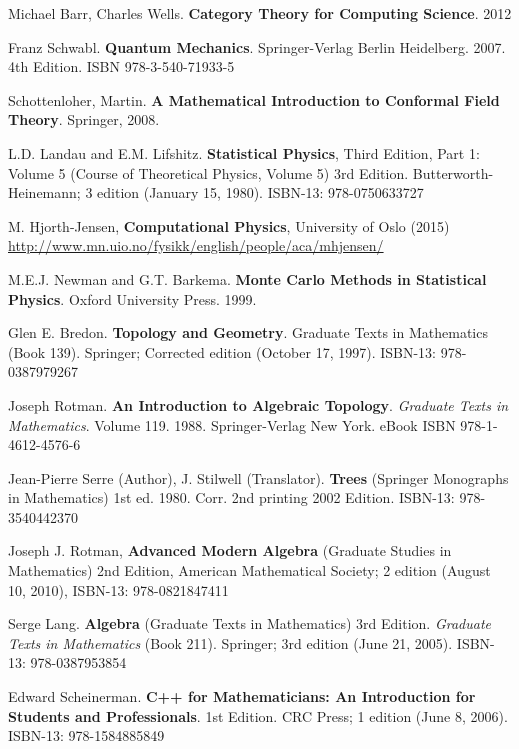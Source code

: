 \documentclass[10pt]{amsart}
\begin{document}
\begin{thebibliography}{9}
Michael Barr, Charles Wells. \textbf{Category Theory for Computing Science}. 2012

Franz Schwabl. \textbf{Quantum Mechanics}. Springer-Verlag Berlin Heidelberg. 2007. 4th Edition. ISBN 978-3-540-71933-5

Schottenloher, Martin.  \textbf{A Mathematical Introduction to Conformal Field Theory}.  Springer, 2008.  

L.D. Landau and E.M. Lifshitz.  \textbf{Statistical Physics}, Third Edition, Part 1: Volume 5 (Course of Theoretical Physics, Volume 5) 3rd Edition.  Butterworth-Heinemann; 3 edition (January 15, 1980).  ISBN-13: 978-0750633727

M. Hjorth-Jensen, \textbf{Computational Physics}, University of Oslo (2015) \url{http://www.mn.uio.no/fysikk/english/people/aca/mhjensen/}



M.E.J. Newman and G.T. Barkema.  \textbf{Monte Carlo Methods in Statistical Physics}.  Oxford University Press.  1999.  


Glen E. Bredon.  \textbf{Topology and Geometry}. Graduate Texts in Mathematics (Book 139).  Springer; Corrected edition (October 17, 1997).  ISBN-13: 978-0387979267

Joseph Rotman. \textbf{An Introduction to Algebraic Topology}. \emph{Graduate Texts in Mathematics}. Volume 119. 1988. Springer-Verlag New York. eBook ISBN
978-1-4612-4576-6

Jean-Pierre Serre (Author), J. Stilwell (Translator).  \textbf{Trees} (Springer Monographs in Mathematics) 1st ed. 1980. Corr. 2nd printing 2002 Edition.  ISBN-13: 978-3540442370

Joseph J. Rotman, \textbf{Advanced Modern Algebra} (Graduate Studies in Mathematics) 2nd Edition, American Mathematical Society; 2 edition (August 10, 2010), ISBN-13: 978-0821847411

Serge Lang. \textbf{Algebra} (Graduate Texts in Mathematics) 3rd Edition. \emph{Graduate Texts in Mathematics} (Book 211). Springer; 3rd edition (June 21, 2005). ISBN-13: 978-0387953854

Edward Scheinerman.  \textbf{C++ for Mathematicians: An Introduction for Students and Professionals}. 1st Edition.  CRC Press; 1 edition (June 8, 2006).  ISBN-13: 978-1584885849 



\end{thebibliography}
\end{document}
